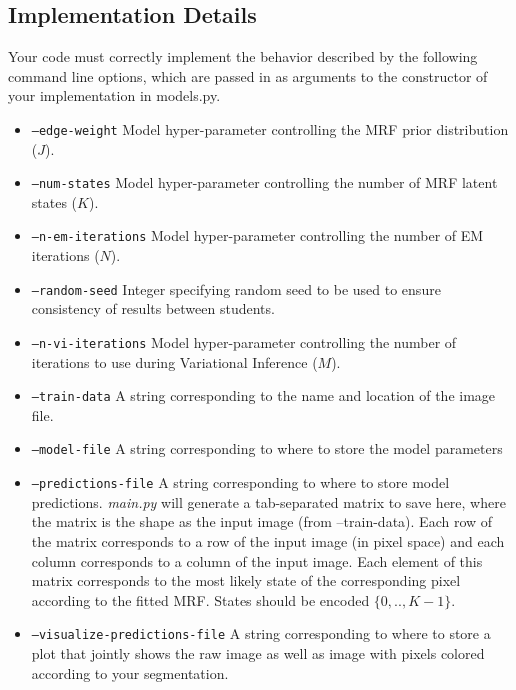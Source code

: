 \documentclass[11pt]{article}
\begin{document}
\subsection{Implementation Details}
Your code must correctly implement the behavior described by the following command line options, which are passed in as arguments to the constructor of your implementation
in models.py.
\begin{itemize}
    \item {\tt--edge-weight} Model hyper-parameter controlling the MRF prior distribution ($J$).
    \item {\tt --num-states} Model hyper-parameter controlling the number of MRF latent states ($K$).
    \item {\tt --n-em-iterations} Model hyper-parameter controlling the number of EM iterations ($N$).
    \item {\tt --random-seed} Integer specifying random seed to be used to ensure consistency of results between students.
    \item {\tt --n-vi-iterations} Model hyper-parameter controlling the number of iterations to use during Variational Inference ($M$).
    \item {\tt --train-data} A string corresponding to the name and location of the image file.
    \item {\tt --model-file} A string corresponding to where to store the model parameters
    \item {\tt --predictions-file} A string corresponding to where to store model predictions. \textit{main.py} will generate a tab-separated matrix to save here, where the matrix is the shape as the input image (from --train-data). Each row of the matrix  corresponds to a row of the input image (in pixel space) and each column corresponds to a column of the input image. Each element of this matrix corresponds to the most likely state of the corresponding pixel according to the fitted MRF. States should be encoded $\{0,..,K-1\}$.
    \item {\tt --visualize-predictions-file} A string corresponding to where to store a plot that jointly shows the raw image as well as image with pixels colored according to your segmentation.
\end{itemize}
\end{document}

